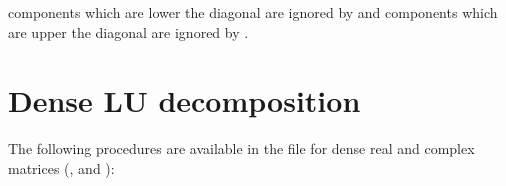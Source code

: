 \documentclass[a4paper,11pt,english]{sphinxmanual}
\begin{document}
components which are lower the diagonal are ignored by  and components which are upper the diagonal are ignored by .


\chapter{Dense LU decomposition}
\label{\detokenize{gmm/denselu:dense-lu-decomposition}}\label{\detokenize{gmm/denselu:gmm-denselu}}\label{\detokenize{gmm/denselu::doc}}
The following procedures are available in the file  for dense real and complex matrices (,  and ):
\end{document}
